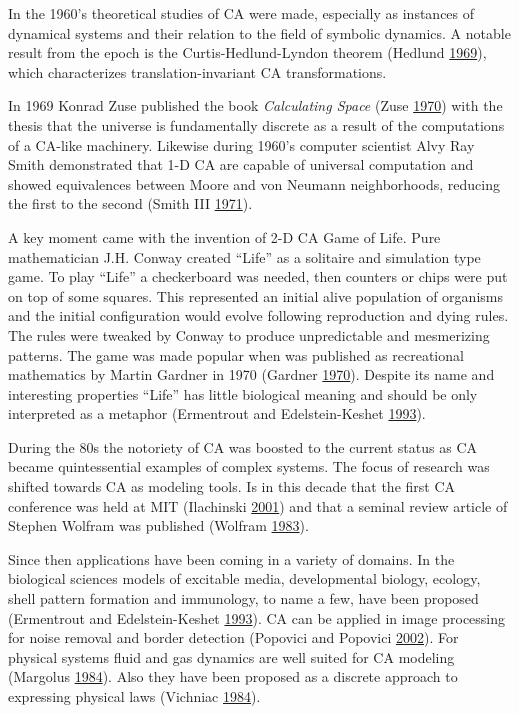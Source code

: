 \documentclass[
]{book}
\begin{document}
In the 1960's theoretical studies of CA were made, especially as instances of dynamical systems and their relation to the field of symbolic dynamics. A notable result from the epoch is the Curtis-Hedlund-Lyndon theorem (Hedlund \protect\hyperlink{ref-hedlund1969endomorphisms}{1969}), which characterizes translation-invariant CA transformations.

In 1969 Konrad Zuse published the book \emph{Calculating Space} (Zuse \protect\hyperlink{ref-zuse1970calculating}{1970}) with the thesis that the universe is fundamentally discrete as a result of the computations of a CA-like machinery. Likewise during 1960's computer scientist Alvy Ray Smith demonstrated that 1-D CA are capable of universal computation and showed equivalences between Moore and von Neumann neighborhoods, reducing the first to the second (Smith III \protect\hyperlink{ref-smith1971simple}{1971}).

A key moment came with the invention of 2-D CA Game of Life. Pure mathematician J.H. Conway created ``Life'' as a solitaire and simulation type game. To play ``Life'' a checkerboard was needed, then counters or chips were put on top of some squares. This represented an initial alive population of organisms and the initial configuration would evolve following reproduction and dying rules. The rules were tweaked by Conway to produce unpredictable and mesmerizing patterns. The game was made popular when was published as recreational mathematics by Martin Gardner in 1970 (Gardner \protect\hyperlink{ref-gardner1970mathematical}{1970}). Despite its name and interesting properties ``Life'' has little biological meaning and should be only interpreted as a metaphor (Ermentrout and Edelstein-Keshet \protect\hyperlink{ref-ermentrout1993cellular}{1993}).

During the 80s the notoriety of CA was boosted to the current status as CA became quintessential examples of complex systems. The focus of research was shifted towards CA as modeling tools. Is in this decade that the first CA conference was held at MIT (Ilachinski \protect\hyperlink{ref-ilachinski2001cellular}{2001}) and that a seminal review article of Stephen Wolfram was published (Wolfram \protect\hyperlink{ref-wolfram1983statistical}{1983}).

Since then applications have been coming in a variety of domains. In the biological sciences models of excitable media, developmental biology, ecology, shell pattern formation and immunology, to name a few, have been proposed (Ermentrout and Edelstein-Keshet \protect\hyperlink{ref-ermentrout1993cellular}{1993}). CA can be applied in image processing for noise removal and border detection (Popovici and Popovici \protect\hyperlink{ref-popovici2002cellular}{2002}). For physical systems fluid and gas dynamics are well suited for CA modeling (Margolus \protect\hyperlink{ref-margolus1984physics}{1984}). Also they have been proposed as a discrete approach to expressing physical laws (Vichniac \protect\hyperlink{ref-vichniac1984simulating}{1984}).
\end{document}
